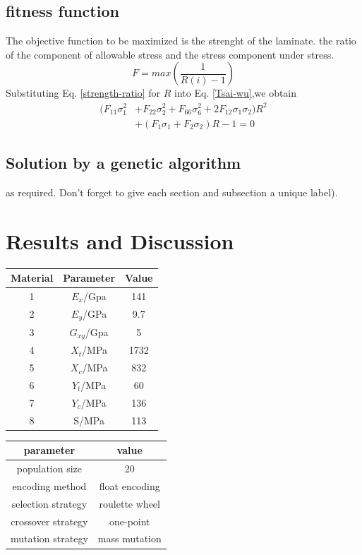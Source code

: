 \documentclass[smallextended]{svjour3}       %
\begin{document}
\subsection{fitness function}
The objective function to be maximized is the strenght of the laminate.
the ratio of the component of allowable stress and the stress component under stress.
\begin{equation*}\label{strength-ratio}
	F=max(\frac{1}{R(i)-1})
\end{equation*}
Substituting Eq. \ref{strength-ratio} for $R$ into Eq. \ref{Tsai-wu},we obtain
\begin{equation*}
	\begin{split}
		(F_{11}\sigma_1^2&+F_{22}\sigma_2^2+F_{66}\sigma_6^2+2F_{12}\sigma_1\sigma_2)R^2 \\
						 &+(F_1\sigma_1+F_2\sigma_2)R-1=0
	\end{split}
\end{equation*}



\subsection{Solution by a genetic algorithm}\label{sec:2}
as required. Don't forget to give each section
and subsection a unique label).




\section{Results and Discussion}

\begin{tabular}{ccc}
	\toprule
	Material& Parameter& Value\\
	\midrule
    1 & $E_x$/Gpa     & 141 \\
    2 & $E_y$/GPa     & 9.7 \\
    3 & $G_{xy}$/Gpa  & 5 \\
	4 & $X_t$/MPa     & 1732 \\
	5 & $X_c$/MPa     & 832 \\
	6 & $Y_t$/MPa     & 60 \\
	7 & $Y_c$/MPa     & 136 \\
	8 & S/MPa       & 113 \\
	\bottomrule
\end{tabular}



\begin{tabular}{cc}
	\toprule
	parameter & value \\
	\midrule
	population size      & 20               \\
    encoding method      & float encoding  \\
	selection strategy   & roulette wheel  \\
	crossover strategy   & one-point \\
	mutation strategy    & mass mutation   \\
	\bottomrule
\end{tabular}
\end{document}
